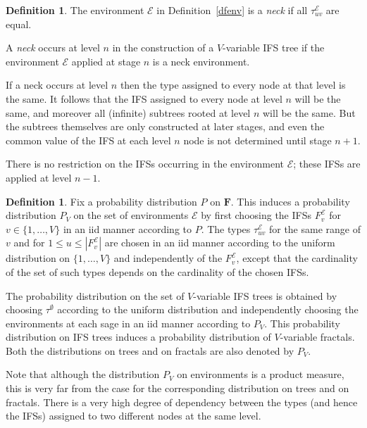 \documentclass[a4paper]{amsart}
\theoremstyle{plain}
\theoremstyle{definition}
\newtheorem{definition}[theorem]{Definition}%
\theoremstyle{remark}
\begin{document}
\begin{definition} The environment $ \mathcal{E} $ in Definition~\ref{dfenv}  is a \emph{neck}  if all $ \tau _{uv} ^{\mathcal{E} } $ are equal.

A \emph{neck} occurs at level $ n $ in the construction of a $ V $-variable IFS tree if the environment $ \mathcal{E} $ applied at stage $ n $ is a neck environment.
\end{definition} 

If a neck occurs at level $ n $  then the type assigned to every node at that level is the same. It follows that the IFS assigned to every node at level $ n $ will be the same, and moreover all (infinite) subtrees rooted at level $ n $ will be the same. But the subtrees themselves are only constructed at later stages, and even  the common  value of the IFS at each level $ n $ node is not determined until stage $ n+1 $.  

There is no restriction on the IFSs occurring in the environment $ \mathcal{E} $; these IFSs are applied at level $ n-1 $.  


\begin{definition} Fix a probability distribution $ P $ on $ \boldsymbol{F} $.  This induces a probability distribution $ P_V $ on the set of environments $ \mathcal{E} $ by first choosing the IFSs $ F^{\mathcal{E} } _v $ for $ v \in \{1,\dots,V\} $ in an iid manner according to $ P $.   The types $ \tau ^{\mathcal{E}} _{uv} $ for the same range of $ v $ and for $ 1 \leq u \leq | F^{\mathcal{E} } _v | $ are chosen in an iid manner according to the uniform distribution on $ \{1,\dots, V \} $ and independently of the  $ F^{\mathcal{E} } _v$, except that the cardinality  of  the set of such types depends on the cardinality of the chosen IFSs.

The probability distribution on the set of $ V $-variable IFS trees is obtained by choosing $ \tau ^\emptyset $ according to the uniform distribution and independently choosing the environments at each sage in an iid manner according to $ P_V $. This probability distribution on IFS trees induces a probability distribution of $ V $-variable fractals.  Both the distributions on trees and on fractals are also denoted by $ P_V $.
\end{definition}

Note that although the distribution $ P_V $ on environments is a product measure, this is very far from the case for the corresponding distribution on trees and on fractals.  There is a very high degree of dependency between the types (and hence the IFSs) assigned to two different nodes at the same level. 
\end{document}
